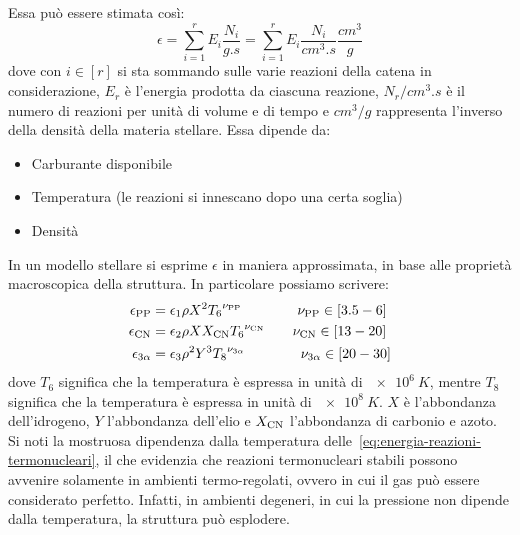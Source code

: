 Essa può essere stimata così:
\begin{equation}
    \epsilon = \sum_{i=1}^{r} E_i \dfrac{N_i}{\si{g.s}} = \sum_{i=1}^{r} E_i \dfrac{N_i}{\si{cm^3.s}} \dfrac{\si{cm^3}}{\si{g}}
\end{equation}
dove con $i \in [r]$ si sta sommando sulle varie reazioni della catena in considerazione, $E_r$ è l'energia prodotta da ciascuna reazione, $N_r/\si{cm^3.s}$ è il numero di reazioni per unità di volume e di tempo e $\si{cm^3} / \si{g}$ rappresenta l'inverso della densità della materia stellare. Essa dipende da:
\begin{itemize}
    \item Carburante disponibile
    \item Temperatura (le reazioni si innescano dopo una certa soglia)
    \item Densità
\end{itemize}

In un modello stellare si esprime $\epsilon$ in maniera approssimata, in base alle proprietà macroscopica della struttura. In particolare possiamo scrivere:
\begin{subequations}
\label{eq:energia-reazioni-termonucleari}
\begin{align}
\epsilon_\textup{PP} &= \epsilon_1 \rho X^2 {T_6}^{\nu_\textup{PP}} \qquad \qquad \nu_\textup{PP} \in [3.5 - 6] \label{eq:energia-PP}\\
\epsilon_\textup{CN} &= \epsilon_2 \rho X X_\textup{CN} {T_6}^{\nu_\textup{CN}} \qquad \nu_\textup{CN} \in [13 - 20] \label{eq:energia-CN}\\
\epsilon_{3\alpha} &= \epsilon_3 \rho^2 Y^3 {T_8}^{\nu_{3\alpha}} \qquad \qquad \nu_{3 \alpha} \in [20 - 30] \label{eq:energia-3A}
\end{align}
\end{subequations}
dove $T_6$ significa che la temperatura è espressa in unità di $\SI{e6}{K}$, mentre $T_8$ significa che la temperatura è espressa in unità di $\SI{e8}{K}$. $X$ è l'abbondanza dell'idrogeno, $Y$ l'abbondanza dell'elio e $X_\textup{CN}$ l'abbondanza di carbonio e azoto. Si noti la mostruosa dipendenza dalla temperatura delle~\eqref{eq:energia-reazioni-termonucleari}, il che evidenzia che reazioni termonucleari stabili possono avvenire solamente in ambienti termo-regolati, ovvero in cui il gas può essere considerato perfetto. Infatti, in ambienti degeneri, in cui la pressione non dipende dalla temperatura, la struttura può esplodere.

